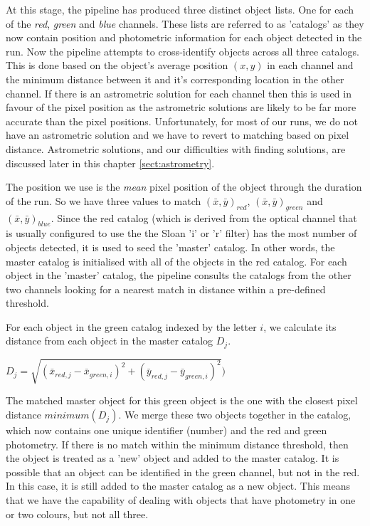 At this stage, the pipeline has produced three distinct object lists. One for each of the \emph{red}, \emph{green} and \emph{blue} channels. These lists are referred to as 'catalogs' as they now contain position and photometric information for each object detected in the run.  Now the pipeline attempts to cross-identify objects across all three catalogs. This is done based on the object's average position $(x, y)$ in each channel and the minimum distance between it and it's corresponding location in the other channel. If there is an astrometric solution for each channel then this is used in favour of the pixel position as the astrometric solutions are likely to be far more accurate than the pixel positions. Unfortunately, for most of our runs, we do not have an astrometric solution and we have to revert to matching based on pixel distance. Astrometric solutions, and our difficulties with finding solutions, are discussed later in this chapter \ref{sect:astrometry}.

The position we use is the \emph{mean} pixel position of the object through the duration of the run. So we have three values to match $(\bar{x}, \bar{y})_{red}$, $(\bar{x}, \bar{y})_{green}$ and $(\bar{x}, \bar{y})_{blue}$. Since the red catalog (which is derived from the optical channel that is usually configured to use the the Sloan 'i' or 'r' filter) has the most number of objects detected, it is used to seed the 'master' catalog. In other words, the master catalog is initialised with all of the objects in the red catalog. For each object in the 'master' catalog, the pipeline consults the catalogs from the other two channels looking for a nearest match in distance within a pre-defined threshold.

For each object in the green catalog indexed by the letter $i$, we calculate its distance from each object in the master catalog $D_j$. 

$D_j = \sqrt{(\bar{x}_{red, j}-\bar{x}_{green, i})^2 + (\bar{y}_{red, j}-\bar{y}_{green, i})^2})$ 

The matched master object for this green object is the one with the closest pixel distance $minimum(D_j)$. We merge these two objects together in the catalog, which now contains one unique identifier (number) and the red and green photometry. If there is no match within the minimum distance threshold, then the object is treated as a 'new' object and added to the master catalog. It is possible that an object can be identified in the green channel, but not in the red. In this case, it is still added to the master catalog as a new object. This means that we have the capability of dealing with objects that have photometry in one or two colours, but not all three. 

